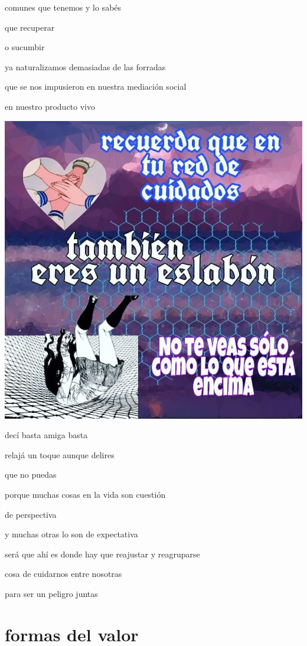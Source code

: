 \documentclass[
]{book}
\begin{document}
comunes que tenemos y lo sabés

que recuperar

o sucumbir

ya naturalizamos demasiadas de las forradas

que se nos impusieron en nuestra mediación social

en nuestro producto vivo

\includegraphics{images/11.png}

decí basta amiga basta

relajá un toque aunque delires

que no puedas

porque muchas cosas en la vida son cuestión

de perspectiva

y muchas otras lo son de expectativa

será que ahí es donde hay que reajustar y reagruparse

cosa de cuidarnos entre nosotras

para ser un peligro juntas

\hypertarget{formas-del-valor}{%
\chapter{formas del valor}\label{formas-del-valor}}
\end{document}
